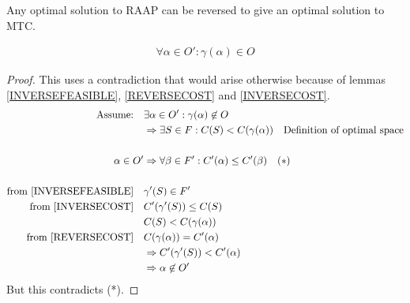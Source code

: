 \begin{lemma}
\label{REVERSEOPTIMAL}
Any optimal solution to RAAP can be reversed to give an optimal solution to MTC.

\begin{align}
	\nonumber \forall \alpha \in O' : \gamma(\alpha) \in O
\end{align}
\end{lemma}
\begin{proof}
This uses a contradiction that would arise otherwise because of lemmas \ref{INVERSEFEASIBLE}, \ref{REVERSECOST} and \ref{INVERSECOST}.
\begin{align}
	\nonumber \mbox{Assume:} \quad & \exists \alpha \in O' : \gamma(\alpha) \not\in O \\
	\nonumber & \Rightarrow \exists S \in F : C(S) < C(\gamma(\alpha)) \quad \mbox{Definition of optimal space} \\
	\nonumber \\
	\nonumber \alpha \in O' & \Rightarrow \forall \beta \in F' : C'(\alpha) \leq C'(\beta) \quad (*)\\
	\nonumber \\
	\nonumber \mbox{from \ref{INVERSEFEASIBLE}}\quad & \gamma'(S) \in F' \\
	\nonumber \mbox{from \ref{INVERSECOST}}\quad & C'(\gamma'(S)) \leq C(S) \\
	\nonumber & C(S) < C(\gamma(\alpha)) \\
	\nonumber \mbox{from \ref{REVERSECOST}}\quad & C(\gamma(\alpha)) = C'(\alpha)\\
	\nonumber & \Rightarrow C'(\gamma'(S)) < C'(\alpha) \\
	\nonumber & \Rightarrow \alpha \not\in O'
\end{align}
But this contradicts (*).

\end{proof}